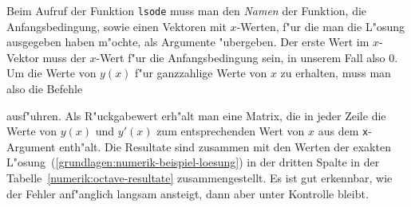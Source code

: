 Beim Aufruf der Funktion \texttt{lsode} muss man den {\em Namen}
der Funktion, die Anfangsbedingung, sowie einen Vektoren mit $x$-Werten,
f"ur die man die L"osung ausgegeben haben m"ochte, als Argumente
"ubergeben.
Der erste Wert im $x$-Vektor muss der $x$-Wert f"ur die Anfangsbedingung
sein, in unserem Fall also $0$.
Um die Werte von $y(x)$ f"ur ganzzahlige Werte von $x$ zu erhalten,
muss man also die Befehle

ausf"uhren.
Als R"uckgabewert erh"alt man eine Matrix, die in jeder Zeile die
Werte von $y(x)$ und $y'(x)$ zum entsprechenden Wert von $x$
aus dem \texttt{x}-Argument enth"alt.
Die Resultate sind zusammen mit den Werten der exakten
L"osung~(\ref{grundlagen:numerik-beispiel-loesung}) in der dritten Spalte 
in der Tabelle~\ref{numerik:octave-resultate} zusammengestellt.
Es ist gut erkennbar, wie der Fehler anf"anglich langsam ansteigt,
dann aber unter Kontrolle bleibt.

